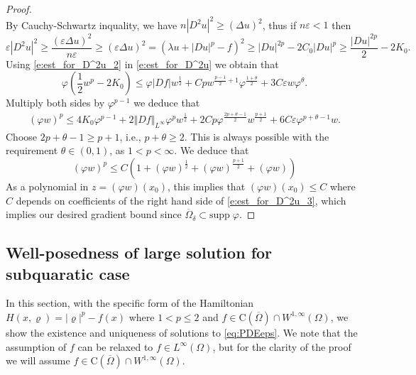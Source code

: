 \documentclass[11pt,reqno]{amsart}
\numberwithin{figure}{section}
\theoremstyle{plain}
\theoremstyle{remark}
\numberwithin{equation}{section}
\begin{document}
\begin{proof}
\begin{equation}
\end{equation}
By Cauchy-Schwartz inquality, we have $n|D^2u|^2\geq (\Delta u)^2$, thus if $n\varepsilon < 1$ then
\begin{equation}\label{e:est_for_D^2u_2}
    \varepsilon |D^2u|^2 \geq \frac{(\varepsilon \Delta u)^2}{n\varepsilon} \geq (\varepsilon \Delta u)^2 = \left(\lambda u + |Du|^p - f\right)^2 \geq |Du|^{2p} - 2C_0|Du|^p \geq \frac{|Du|^{2p}}{2} - 2K_0.
\end{equation}
Using \eqref{e:est_for_D^2u_2} in \eqref{e:est_for_D^2u} we obtain that
\begin{equation*}
    \varphi\left(\frac{1}{2}w^p - 2K_0\right) \leq \varphi |Df|w^{\frac{1}{2}}+ Cp w^{\frac{p-1}{2}+1} \varphi^{\frac{1+\theta}{2}} + 3C\varepsilon w \varphi^{\theta}.
\end{equation*}
Multiply both sides by $\varphi^{p-1}$ we deduce that
\begin{align*}
    (\varphi w)^p \leq 4K_0\varphi^{p-1} + 2\Vert Df\Vert_{L^\infty}\varphi^p w^{\frac{1}{2}} + 2Cp \varphi^{\frac{2p+\theta - 1}{2}}w^{\frac{p+1}{2}} + 6C\varepsilon \varphi^{p+\theta - 1}w.
\end{align*}
Choose $2p+\theta -1 \geq p+1$, i.e., $p+\theta\geq 2$. This is always possible with the requirement $\theta \in (0,1)$, as $1<p <\infty$. We deduce that 
\begin{equation}\label{e:est_for_D^2u_3}
    (\varphi w)^p \leq C\left(1+ (\varphi w)^\frac{1}{2} + (\varphi w)^\frac{p+1}{2} +(\varphi w)\right)
\end{equation}
As a polynomial in $z = (\varphi w)(x_0)$, this implies that $(\varphi w)(x_0)\leq C$ where $C$ depends on coefficients of the right hand side of \eqref{e:est_for_D^2u_3}, which implies our desired gradient bound since $\overline{\Omega}_\delta\subset \mathrm{supp}\;\varphi$.
\end{proof}



\subsection{Well-posedness of large solution for subquaratic case} In this section, with the specific form of the Hamiltonian $H(x,\varrho) = |\varrho|^p - f(x)$ where $1<p\leq 2$ and $f\in \mathrm{C}(\overline{\Omega})\cap W^{1,\infty}(\Omega)$, we show the existence and uniqueness of solutions to \eqref{eq:PDEeps}. 
We note that the assumption of $f$ can be relaxed to $f\in L^\infty(\Omega)$, but for the clarity of the proof we will assume $f\in \mathrm{C}(\overline{\Omega})\cap W^{1,\infty}(\Omega)$.
\end{document}
